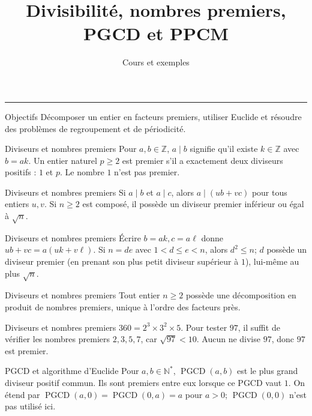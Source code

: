 \documentclass[aspectratio=169,10pt]{beamer}
\title{Divisibilité, nombres premiers, PGCD et PPCM}
\subtitle{Cours et exemples}
\date{}
\author{}
\begin{document}
\begin{frame}[plain]
\vfill
{\inserttitle\par}
\medskip
{\insertsubtitle\par}
\medskip
{\rule{\textwidth}{.5pt}}
\vfill
\end{frame}
\begin{frame}{Objectifs}
Décomposer un entier en facteurs premiers, utiliser Euclide et résoudre des problèmes de regroupement et de périodicité.
\end{frame}
\begin{frame}{Diviseurs et nombres premiers}
Pour \(a,b\in\mathbb{Z}\), \(a\mid b\) signifie qu’il existe \(k\in\mathbb{Z}\) avec \(b=ak\). Un entier naturel \(p\ge2\) est premier s’il a exactement deux diviseurs positifs : \(1\) et \(p\). Le nombre \(1\) n’est pas premier.
\end{frame}
\begin{frame}{Diviseurs et nombres premiers}
Si \(a\mid b\) et \(a\mid c\), alors \(a\mid (ub+vc)\) pour tous entiers \(u,v\). Si \(n\ge2\) est composé, il possède un diviseur premier inférieur ou égal à \(\sqrt n\).
\end{frame}
\begin{frame}{Diviseurs et nombres premiers}
Écrire \(b=ak,c=a\ell\) donne \(ub+vc=a(uk+v\ell)\). Si \(n=de\) avec \(1<d\le e<n\), alors \(d^2\le n\); \(d\) possède un diviseur premier (en prenant son plus petit diviseur supérieur à \(1\)), lui-même au plus \(\sqrt n\).
\end{frame}
\begin{frame}{Diviseurs et nombres premiers}
Tout entier \(n\ge2\) possède une décomposition en produit de nombres premiers, unique à l’ordre des facteurs près.
\end{frame}
\begin{frame}{Diviseurs et nombres premiers}
\(360=2^3\times3^2\times5\). Pour tester \(97\), il suffit de vérifier les nombres premiers \(2,3,5,7\), car \(\sqrt{97}<10\). Aucun ne divise \(97\), donc \(97\) est premier.
\end{frame}
\begin{frame}{PGCD et algorithme d’Euclide}
Pour \(a,b\in\mathbb{N}^*\), \(\operatorname{PGCD}(a,b)\) est le plus grand diviseur positif commun. Ils sont premiers entre eux lorsque ce PGCD vaut \(1\). On étend par \(\operatorname{PGCD}(a,0)=\operatorname{PGCD}(0,a)=a\) pour \(a>0\); \(\operatorname{PGCD}(0,0)\) n’est pas utilisé ici.
\end{frame}
\end{document}
